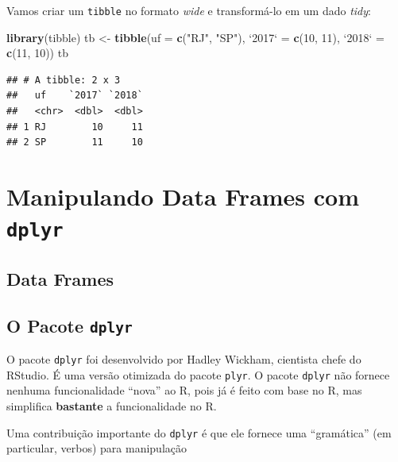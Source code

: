 \documentclass[]{book}
\newenvironment{Shaded}{\begin{snugshade}}{\end{snugshade}}
\newcommand{\DataTypeTok}[1]{\textcolor[rgb]{0.13,0.29,0.53}{#1}}
\newcommand{\DecValTok}[1]{\textcolor[rgb]{0.00,0.00,0.81}{#1}}
\newcommand{\KeywordTok}[1]{\textcolor[rgb]{0.13,0.29,0.53}{\textbf{#1}}}
\newcommand{\NormalTok}[1]{#1}
\newcommand{\StringTok}[1]{\textcolor[rgb]{0.31,0.60,0.02}{#1}}
\begin{document}
Vamos criar um \texttt{tibble} no formato \emph{wide} e transformá-lo em um dado \emph{tidy}:

\begin{Shaded}
\begin{Highlighting}[]
\KeywordTok{library}\NormalTok{(tibble)}
\NormalTok{tb <-}\StringTok{ }\KeywordTok{tibble}\NormalTok{(}\DataTypeTok{uf =} \KeywordTok{c}\NormalTok{(}\StringTok{"RJ"}\NormalTok{, }\StringTok{"SP"}\NormalTok{), }\StringTok{`}\DataTypeTok{2017}\StringTok{`}\NormalTok{ =}\StringTok{ }\KeywordTok{c}\NormalTok{(}\DecValTok{10}\NormalTok{, }\DecValTok{11}\NormalTok{), }\StringTok{`}\DataTypeTok{2018}\StringTok{`}\NormalTok{ =}\StringTok{ }\KeywordTok{c}\NormalTok{(}\DecValTok{11}\NormalTok{, }\DecValTok{10}\NormalTok{))}
\NormalTok{tb}
\end{Highlighting}
\end{Shaded}

\begin{verbatim}
## # A tibble: 2 x 3
##   uf    `2017` `2018`
##   <chr>  <dbl>  <dbl>
## 1 RJ        10     11
## 2 SP        11     10
\end{verbatim}

\hypertarget{method}{%
\chapter{\texorpdfstring{Manipulando Data Frames com \texttt{dplyr}}{Manipulando Data Frames com dplyr}}\label{method}}

\hypertarget{data-frames}{%
\section{Data Frames}\label{data-frames}}

\hypertarget{o-pacote-dplyr}{%
\section{\texorpdfstring{O Pacote \texttt{dplyr}}{O Pacote dplyr}}\label{o-pacote-dplyr}}

O pacote \texttt{dplyr} foi desenvolvido por Hadley Wickham, cientista chefe do RStudio. É uma versão otimizada do pacote \texttt{plyr}. O pacote \texttt{dplyr} não fornece nenhuma funcionalidade ``nova'' ao R, pois já é feito com base no R, mas simplifica \textbf{bastante} a funcionalidade no R.

Uma contribuição importante do \texttt{dplyr} é que ele fornece uma ``gramática'' (em particular, verbos) para manipulação
\end{document}
